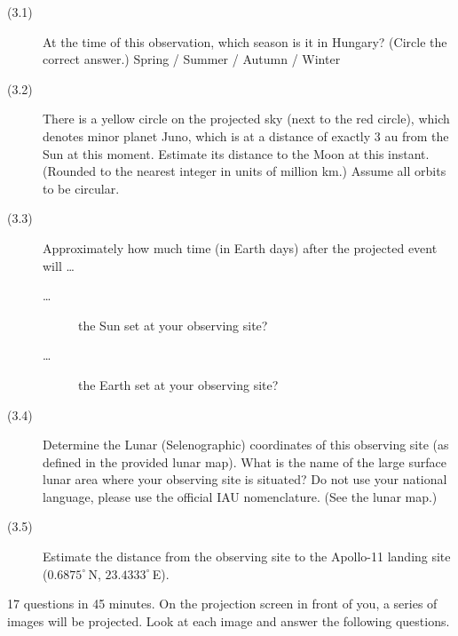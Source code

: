 \begin{description}
\item[(3.1)] At the time of this observation, which season is it in Hungary?
  (Circle the correct answer.) Spring / Summer / Autumn / Winter
\item[(3.2)] There is a yellow circle on the projected sky (next to the red
  circle), which denotes minor planet Juno, which is at a distance of
  exactly 3 au from the Sun at this moment. Estimate its distance to the
  Moon at this instant. (Rounded to the nearest integer in units of million
  km.) Assume all orbits to be circular.
\item[(3.3)] Approximately how much time (in Earth days) after the projected
  event will \ldots
  \begin{description}
  \item[\rm\ldots] the Sun set at your observing site?
  \item[\rm\ldots] the Earth set at your observing site?
  \end{description}
\item[(3.4)] Determine the Lunar (Selenographic) coordinates of this
  observing site (as defined in the provided lunar map). What is the name of
  the large surface lunar area where your observing site is situated? Do not
  use your national language, please use the official IAU nomenclature. (See
  the lunar map.)
\item[(3.5)] Estimate the distance from the observing site to the Apollo-11
  landing site ($0.6875^\circ$\,N, $23.4333^\circ$\,E).
\end{description}


17 questions in 45 minutes. On the projection screen in front of you, a
series of images will be projected. Look at each image and answer the
following questions.

